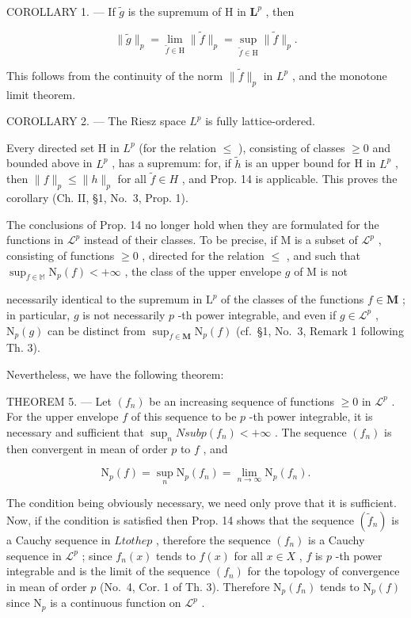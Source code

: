 COROLLARY 1. --- If \(\widetilde{g}\) is the supremum of H in \(\mathbf{L}^p\) , then

\[
\| \widetilde {g} \| _ {p} = \lim _ {\widetilde {f} \in \mathrm{H}} \| \widetilde {f} \| _ {p} = \sup _ {\widetilde {f} \in \mathrm{H}} \| \widetilde {f} \| _ {p}.\tag{10}
\]

This follows from the continuity of the norm \(\|\widetilde{f}\|_{p}\) in \(L^{p}\) , and the monotone limit theorem.

COROLLARY 2. --- The Riesz space \(L^{p}\) is fully lattice-ordered.

Every directed set H in \(L^{p}\) (for the relation \(\leqslant\) ), consisting of classes \(\geqslant 0\) and bounded above in \(L^{p}\) , has a supremum: for, if \(\widetilde{h}\) is an upper bound for H in \(L^{p}\) , then \(\|f\|_{p} \leqslant \|h\|_{p}\) for all \(\widetilde{f} \in H\) , and Prop. 14 is applicable. This proves the corollary (Ch. II, §1, No.~3, Prop. 1).

The conclusions of Prop. 14 no longer hold when they are formulated for the functions in \(\mathcal{L}^p\) instead of their classes. To be precise, if M is a subset of \(\mathcal{L}^p\) , consisting of functions \(\geqslant 0\) , directed for the relation \(\leqslant\) , and such that \(\sup_{f\in\mathbb{M}}\mathrm{N}_{p}(f)<+\infty\) , the class of the upper envelope \(g\) of M is not

necessarily identical to the supremum in \(\mathrm{L}^p\) of the classes of the functions \(f \in \mathbf{M}\) ; in particular, \(g\) is not necessarily \(p\) -th power integrable, and even if \(g \in \mathcal{L}^p\) , \(\mathrm{N}_p(g)\) can be distinct from \(\sup_{f \in \mathbf{M}} \mathrm{N}_p(f)\) (cf.~§1, No.~3, Remark 1 following Th. 3).

Nevertheless, we have the following theorem:

THEOREM 5. --- Let \((f_n)\) be an increasing sequence of functions \(\geqslant 0\) in \(\mathcal{L}^p\) . For the upper envelope \(f\) of this sequence to be \(p\) -th power integrable, it is necessary and sufficient that \(\sup_{n} N sub p(f_n) < +\infty\) . The sequence \((f_n)\) is then convergent in mean of order \(p\) to \(f\) , and

\[
\mathrm{N} _ {p} (f) = \sup _ {n} \mathrm{N} _ {p} (f _ {n}) = \lim _ {n \rightarrow \infty} \mathrm{N} _ {p} (f _ {n}).\tag{11}
\]

The condition being obviously necessary, we need only prove that it is sufficient. Now, if the condition is satisfied then Prop. 14 shows that the sequence \((\tilde{f}_n)\) is a Cauchy sequence in \(L to the p\) , therefore the sequence \((f_n)\) is a Cauchy sequence in \(\mathcal{L}^p\) ; since \(f_n(x)\) tends to \(f(x)\) for all \(x \in X\) , \(f\) is \(p\) -th power integrable and is the limit of the sequence \((f_n)\) for the topology of convergence in mean of order \(p\) (No.~4, Cor. 1 of Th. 3). Therefore \(\mathrm{N}_p(f_n)\) tends to \(\mathrm{N}_p(f)\) since \(\mathrm{N}_p\) is a continuous function on \(\mathcal{L}^p\) .

